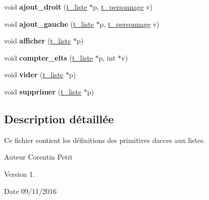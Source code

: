 \begin{DoxyCompactItemize}
\item 
void {\bfseries ajout\+\_\+droit} (\hyperlink{a00006}{t\+\_\+liste} $\ast$p, \hyperlink{a00009}{t\+\_\+personnage} v)\hypertarget{a00024_af63f749e5d177cf431f219915e24a76d}{}\label{a00024_af63f749e5d177cf431f219915e24a76d}

\item 
void {\bfseries ajout\+\_\+gauche} (\hyperlink{a00006}{t\+\_\+liste} $\ast$p, \hyperlink{a00009}{t\+\_\+personnage} v)\hypertarget{a00024_a3c18a559a8adbe1dd9e9bcd49c680c6b}{}\label{a00024_a3c18a559a8adbe1dd9e9bcd49c680c6b}

\item 
void {\bfseries afficher} (\hyperlink{a00006}{t\+\_\+liste} $\ast$p)\hypertarget{a00024_a066b4e6b2b8afb789416a06cf18d52b8}{}\label{a00024_a066b4e6b2b8afb789416a06cf18d52b8}

\item 
void {\bfseries compter\+\_\+elts} (\hyperlink{a00006}{t\+\_\+liste} $\ast$p, int $\ast$v)\hypertarget{a00024_acea998490ff91e660d2f7d7530a020b7}{}\label{a00024_acea998490ff91e660d2f7d7530a020b7}

\item 
void {\bfseries vider} (\hyperlink{a00006}{t\+\_\+liste} $\ast$p)\hypertarget{a00024_a7ecbb44530688750d47fa00a96d6add8}{}\label{a00024_a7ecbb44530688750d47fa00a96d6add8}

\item 
void {\bfseries supprimer} (\hyperlink{a00006}{t\+\_\+liste} $\ast$p)\hypertarget{a00024_aab08b37ee056b9411e2265637fb3af1c}{}\label{a00024_aab08b37ee056b9411e2265637fb3af1c}

\end{DoxyCompactItemize}


\subsection{Description détaillée}
Ce fichier contient les définitions des primitives d\textquotesingle{}acces aux listes. 

\begin{DoxyAuthor}{Auteur}
Corentin Petit 
\end{DoxyAuthor}
\begin{DoxyVersion}{Version}
1. 
\end{DoxyVersion}
\begin{DoxyDate}{Date}
09/11/2016 
\end{DoxyDate}
